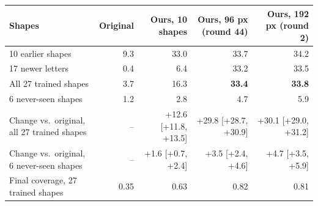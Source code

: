 
\begin{tabular}{lrrrr}
\toprule
Shapes & Original & Ours, 10 shapes & Ours, 96 px (round 44) & Ours, 192 px (round 2) \\
\midrule
10 earlier shapes & 9.3 & 33.0 & 33.7 & 34.2 \\
17 newer letters & 0.4 & 6.4 & 33.2 & 33.5 \\
All 27 trained shapes & 3.7 & 16.3 & \textbf{33.4} & \textbf{33.8} \\
6 never-seen shapes & 1.2 & 2.8 & 4.7 & 5.9 \\
\midrule
Change vs.\ original, all 27 trained shapes & -- & +12.6 [+11.8, +13.5] & +29.8 [+28.7, +30.9] & +30.1 [+29.0, +31.2] \\
Change vs.\ original, 6 never-seen shapes & -- & +1.6 [+0.7, +2.4] & +3.5 [+2.4, +4.6] & +4.7 [+3.5, +5.9] \\
Final coverage, 27 trained shapes & 0.35 & 0.63 & 0.82 & 0.81 \\
\bottomrule
\end{tabular}
